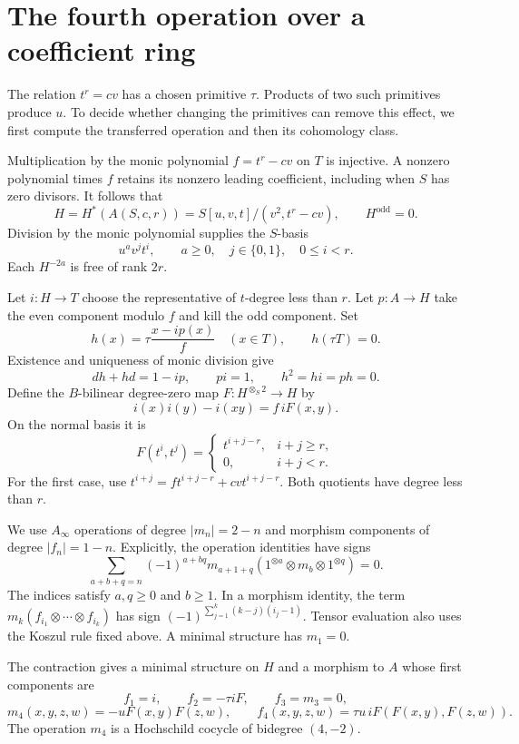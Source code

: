 \section{The fourth operation over a coefficient ring}
\label{v4-arith:ks:fourth-operation}

The relation $t^r=cv$ has a chosen primitive $\tau$.
Products of two such primitives produce $u$.
To decide whether changing the primitives can remove this effect,
we first compute the transferred operation and then its cohomology class.

Multiplication by the monic polynomial $f=t^r-cv$ on $T$ is injective.
A nonzero polynomial times $f$ retains its nonzero leading coefficient,
including when $S$ has zero divisors.
It follows that
\begin{equation}\label{v4-arith:ks:family-cohomology}
 H=H^*(A(S,c,r))=S[u,v,t]/(v^2,t^r-cv),\qquad H^{\mathrm{odd}}=0.
\end{equation}
Division by the monic polynomial supplies the $S$-basis
\[
 u^av^jt^i,\qquad a\geq0,\quad j\in\{0,1\},\quad 0\leq i<r.
\]
Each $H^{-2a}$ is free of rank $2r$.

Let $i:H\to T$ choose the representative of $t$-degree less than $r$.
Let $p:A\to H$ take the even component modulo $f$ and kill the odd component.
Set
\[
 h(x)=\tau\frac{x-ip(x)}f\quad(x\in T),\qquad h(\tau T)=0.
\]
Existence and uniqueness of monic division give
\[
 dh+hd=1-ip,\qquad pi=1,\qquad h^2=hi=ph=0.
\]
Define the $B$-bilinear degree-zero map $F:H^{\otimes_S2}\to H$ by
\[
 i(x)i(y)-i(xy)=f\,iF(x,y).
\]
On the normal basis it is
\[
 F(t^i,t^j)=
 \begin{cases}
 t^{i+j-r},&i+j\geq r,\\
 0,&i+j<r.
 \end{cases}
\]
For the first case, use
$t^{i+j}=f t^{i+j-r}+cv t^{i+j-r}$.
Both quotients have degree less than $r$.

We use $A_\infty$ operations of degree $|m_n|=2-n$
and morphism components of degree $|f_n|=1-n$.
Explicitly, the operation identities have signs
\[
 \sum_{a+b+q=n}(-1)^{a+bq}
 m_{a+1+q}(1^{\otimes a}\otimes m_b\otimes1^{\otimes q})=0.
\]
The indices satisfy $a,q\geq0$ and $b\geq1$.
In a morphism identity, the term
$m_k(f_{i_1}\otimes\cdots\otimes f_{i_k})$
has sign $(-1)^{\sum_{j=1}^k(k-j)(i_j-1)}$.
Tensor evaluation also uses the Koszul rule fixed above.
A minimal structure has $m_1=0$.

\begin{lemma}
\label{v4-arith:ks:transfer-four}
\ClaimStatusProvedHere{}
The contraction gives a minimal structure on $H$ and a morphism to $A$
whose first components are
\[
 f_1=i,\qquad f_2=-\tau iF,\qquad f_3=m_3=0,
\]
\begin{equation}\label{v4-arith:ks:m-four}
 m_4(x,y,z,w)=-uF(x,y)F(z,w),\qquad
 f_4(x,y,z,w)=\tau u\,iF(F(x,y),F(z,w)).
\end{equation}
The operation $m_4$ is a Hochschild cocycle of bidegree $(4,-2)$.
\end{lemma}

